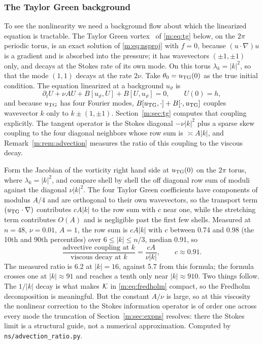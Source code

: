 \subsubsection{The Taylor Green background} To see the nonlinearity we need a background flow about which the linearized equation is tractable. The Taylor Green vortex~\cite{taylorgreen1937} of \eqref{m:eq:tg} below, on the $2\pi$ periodic torus, is an exact solution of \eqref{m:eq:nsproj} with $f=0$, because $(u\cdot\nabla)u$ is a gradient and is absorbed into the pressure; it has wavevectors $(\pm1,\pm1)$ only, and decays at the Stokes rate of its own mode. On this torus $\lambda_k=|k|^2$, so that the mode $(1,1)$ decays at the rate $2\nu$. Take $\theta_0=u_{\rm TG}(0)$ as the true initial condition. The equation linearized at a background $u_\vartheta$ is
\begin{equation}\label{m:eq:tangentgen}
\partial_tU+\nu AU+B[u_\vartheta,U]+B[U,u_\vartheta]=0,\qquad U(0)=h,
\end{equation}
and because $u_{\rm TG}$ has four Fourier modes, $B[u_{\rm TG},\cdot]+B[\cdot,u_{\rm TG}]$ couples wavevector $k$ only to $k\pm(1,\pm1)$. Section~\ref{m:sec:tg} computes that coupling explicitly. The tangent operator is the Stokes diagonal $-\nu|k|^2$ plus a sparse skew coupling to the four diagonal neighbors whose row sum is $\asymp A|k|$, and Remark~\ref{m:rem:advection} measures the ratio of this coupling to the viscous decay.

\begin{remark}\label{m:rem:advection}
Form the Jacobian of the vorticity right hand side at $u_{\rm TG}(0)$ on the $2\pi$ torus, where $\lambda_k=|k|^2$, and compare shell by shell the off diagonal row sum of moduli against the diagonal $\nu|k|^2$. The four Taylor Green coefficients have components of modulus $A/4$ and are orthogonal to their own wavevectors, so the transport term $(u_{\rm TG}\cdot\nabla)$ contributes $cA|k|$ to the row sum with $c$ near one, while the stretching term contributes $O(A)$ and is negligible past the first few shells. Measured at $n=48$, $\nu=0.01$, $A=1$, the row sum is $cA|k|$ with $c$ between 0.74 and 0.98 (the 10th and 90th percentiles) over $6\le|k|\le n/3$, median 0.91, so
\[
\frac{\text{advective coupling at }k}{\text{viscous decay at }k}=\frac{cA}{\nu|k|},\qquad
c\approx0.91 .
\]
The measured ratio is 6.2 at $|k|=16$, against 5.7 from this formula; the formula crosses one at $|k|\approx91$ and reaches a tenth only near $|k|\approx910$. Two things follow. The $1/|k|$ decay is what makes $\mathcal{K}$ in \eqref{m:eq:fredholm} compact, so the Fredholm decomposition is meaningful. But the constant $A/\nu$ is large, so at this viscosity the nonlinear correction to the Stokes information operator is of order one across every mode the truncation of Section~\ref{m:sec:expns} resolves: there the Stokes limit is a structural guide, not a numerical approximation. Computed by \texttt{ns/advection\_ratio.py}.
\end{remark}


